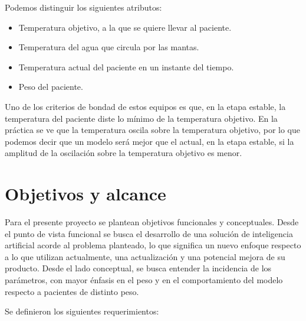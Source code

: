 Podemos distinguir los siguientes atributos:
\begin{itemize}
	\item Temperatura objetivo, a la que se quiere llevar al paciente.
	\item Temperatura del agua que circula por las mantas.
	\item Temperatura actual del paciente en un instante del tiempo.
	\item Peso del paciente.
\end{itemize}

Uno de los criterios de bondad de estos equipos es que, en la etapa estable, la temperatura del paciente diste lo mínimo de la temperatura objetivo. En la práctica se ve que la temperatura oscila sobre la temperatura objetivo, por lo que podemos decir que un modelo será mejor que el actual, en la etapa estable, si la amplitud de la oscilación sobre la temperatura objetivo es menor.

\section{Objetivos y alcance}
Para el presente proyecto se plantean objetivos funcionales y conceptuales. Desde el punto de vista funcional se busca el desarrollo de una solución de inteligencia artificial acorde al problema planteado, lo que significa un nuevo enfoque respecto a lo que utilizan actualmente, una actualización y una potencial mejora de su producto. Desde el lado conceptual, se busca entender la incidencia de los parámetros, con mayor énfasis en el peso y en el comportamiento del modelo respecto a pacientes de distinto peso.

Se definieron los siguientes requerimientos:

